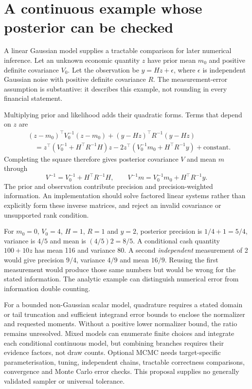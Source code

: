 \section{A continuous example whose posterior can be checked}

A linear Gaussian model supplies a tractable comparison for later numerical
inference. Let an unknown economic quantity $z$ have prior mean $m_0$ and positive
definite covariance $V_0$. Let the observation be $y=Hz+\epsilon$, where
$\epsilon$ is independent Gaussian noise with positive definite covariance
$R$. The measurement-error assumption is substantive: it describes this example,
not rounding in every financial statement.

Multiplying prior and likelihood adds their quadratic forms. Terms that depend
on $z$ are
\begin{align*}
 &(z-m_0)^\top V_0^{-1}(z-m_0)
 +(y-Hz)^\top R^{-1}(y-Hz)\\
 &\quad=z^\top(V_0^{-1}+H^\top R^{-1}H)z
 -2z^\top(V_0^{-1}m_0+H^\top R^{-1}y)+\text{constant}.
\end{align*}
Completing the square therefore gives posterior covariance $V$ and mean $m$
through
\[
 V^{-1}=V_0^{-1}+H^\top R^{-1}H,\qquad
 V^{-1}m=V_0^{-1}m_0+H^\top R^{-1}y.
\]
The prior and observation contribute precision and precision-weighted
information. An implementation should solve factored linear systems rather
than explicitly form these inverse matrices, and reject an invalid covariance
or unsupported rank condition.

For $m_0=0$, $V_0=4$, $H=1$, $R=1$ and $y=2$, posterior precision is
$1/4+1=5/4$, variance is $4/5$ and mean is $(4/5)2=8/5$. A conditional cash
quantity $100+10z$ has mean 116 and variance 80. A second \emph{independent}
measurement of 2 would give precision $9/4$, variance $4/9$ and mean $16/9$.
Reusing the first measurement would produce those same numbers but would be
wrong for the stated information. The analytic example can distinguish numerical
error from information double counting.

For a bounded non-Gaussian scalar model, quadrature requires a stated domain
or tail truncation and sufficient integrand error bounds to enclose the
normalizer and requested moments. Without a positive lower normalizer bound,
the ratio remains unresolved. Mixed models can enumerate finite choices and
integrate each conditional continuous model, but combining branches requires
their evidence factors, not draw counts. Optional MCMC needs target-specific
parameterisation, tuning, independent chains, tractable correctness comparisons,
convergence and Monte Carlo error checks. This proposal supplies no generally
validated sampler or universal tolerance.

